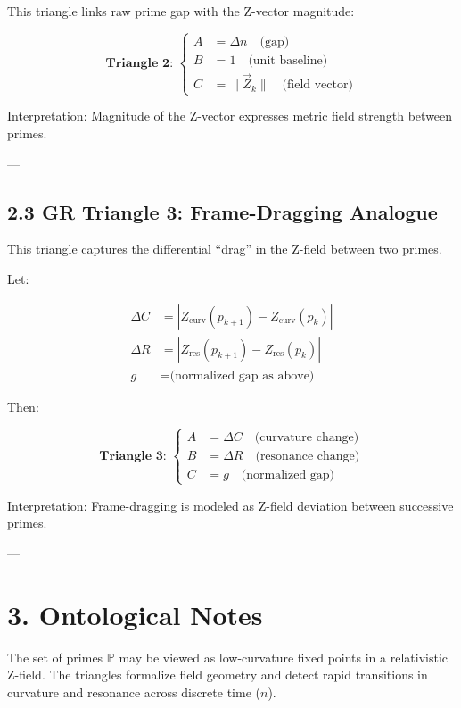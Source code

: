 \documentclass{article}
\begin{document}
This triangle links raw prime gap with the Z-vector magnitude:

\[
\boxed{
\textbf{Triangle 2: } 
\left\{
\begin{aligned}
A &= \Delta n \quad \text{(gap)} \\
B &= 1 \quad \text{(unit baseline)} \\
C &= \| \vec{Z}_k \| \quad \text{(field vector)}
\end{aligned}
\right.
}
\]

Interpretation: Magnitude of the Z-vector expresses metric field strength between primes.

---

\subsection*{2.3 GR Triangle 3: Frame-Dragging Analogue}

This triangle captures the differential “drag” in the Z-field between two primes.

Let:

\[
\begin{aligned}
\Delta C &= |Z_{\text{curv}}(p_{k+1}) - Z_{\text{curv}}(p_k)| \\
\Delta R &= |Z_{\text{res}}(p_{k+1}) - Z_{\text{res}}(p_k)| \\
g &= \text{(normalized gap as above)}
\end{aligned}
\]

Then:

\[
\boxed{
\textbf{Triangle 3: } 
\left\{
\begin{aligned}
A &= \Delta C \quad \text{(curvature change)} \\
B &= \Delta R \quad \text{(resonance change)} \\
C &= g \quad \text{(normalized gap)}
\end{aligned}
\right.
}
\]

Interpretation: Frame-dragging is modeled as Z-field deviation between successive primes.

---

\section*{3. Ontological Notes}

The set of primes \( \mathbb{P} \) may be viewed as low-curvature fixed points in a relativistic Z-field. The triangles formalize field geometry and detect rapid transitions in curvature and resonance across discrete time (\( n \)).
\end{document}
